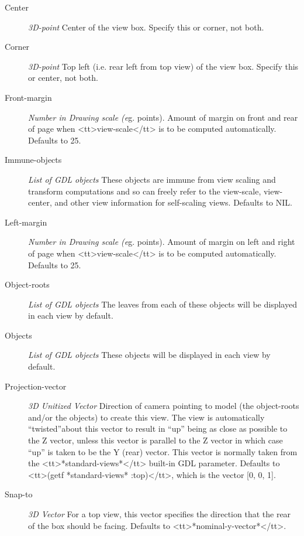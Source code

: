 \documentclass [11pt]{book}
\begin{document}
\begin{itemize}
\begin{description}
\item [Center]
\emph{3D-point} Center of the view box. Specify this or corner, not both.


\item [Corner]
\emph{3D-point} Top left (i.e. rear left from top view) of the view box. Specify this or center, not both.


\item [Front-margin]
\emph{Number in Drawing scale (e}g. points). Amount of margin on front and rear
of page when <tt>view-scale</tt> is to be computed automatically. Defaults to 25.


\item [Immune-objects]
\emph{List of GDL objects} These objects are immune from view scaling and transform computations and so can freely refer
to the view-scale, view-center, and other view information for self-scaling views. Defaults to NIL.


\item [Left-margin]
\emph{Number in Drawing scale (e}g. points). Amount of margin on left and right
of page when <tt>view-scale</tt> is to be computed automatically. Defaults to 25.


\item [Object-roots]
\emph{List of GDL objects} The leaves from each of these objects will be displayed in each view by default.


\item [Objects]
\emph{List of GDL objects} These objects will be displayed in each view by default.


\item [Projection-vector]
\emph{3D Unitized Vector} Direction of camera pointing to model (the object-roots and/or the objects) to create
this view. The view is automatically ``twisted''about this vector to result in ``up'' being as close as
possible to the Z vector, unless this vector is parallel to the Z vector in which case ``up'' is taken
to be the Y (rear) vector. This vector is normally taken from the <tt>*standard-views*</tt> built-in GDL
parameter. Defaults to <tt>(getf *standard-views* :top)</tt>, which is the vector [0, 0, 1].


\item [Snap-to]
\emph{3D Vector} For a top view, this vector specifies the direction that the rear of
the box should be facing. Defaults to <tt>*nominal-y-vector*</tt>.



\end{description}
\end{itemize}
\end{document}
